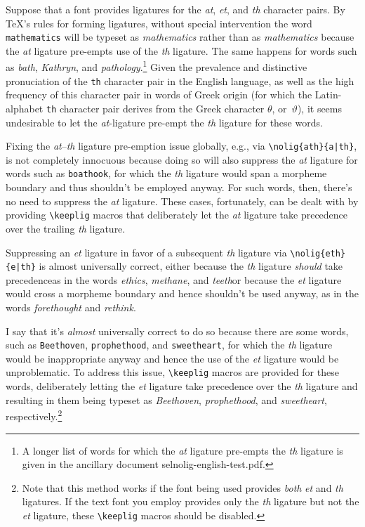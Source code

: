 \documentclass[12pt]{article}
\newcommand{\pkg}[1]{\textsf{#1}}
\newcommand{\opt}[1]{\texttt{#1}}
\newcommand{\cmmd}[1]{\texttt{\textbackslash #1}}
\begin{document}
Suppose that a font provides ligatures for the \emph{at}, \emph{et}, and \emph{th} character pairs. By \TeX's rules for forming ligatures, without special intervention the word \opt{mathematics} will be typeset as \emph{m\mbox{at}hematics} rather than as \emph{mathematics} because the \emph{at} ligature pre-empts use of the \emph{th} ligature. The same happens for words such as \emph{b\mbox{at}h}, \emph{K\mbox{at}hryn}, and \emph{p\mbox{at}hology}.\footnote{A longer list of words for which the \emph{at} ligature pre-empts the \emph{th} ligature is given in the ancillary document \pkg{selnolig-english-test.pdf}. }
Given the prevalence and distinctive pronuciation of the \opt{th} character pair in the English language, as well as the high frequency of this character pair in words of Greek origin (for which the Latin-alphabet \opt{th} character pair derives from the Greek character $\theta$, or~$\vartheta$), it seems undesirable to let the \emph{at}-ligature pre-empt the \emph{th} ligature for these words. 

Fixing the \emph{at}--\emph{th} ligature pre-emption issue globally, e.g., via \Verb+\nolig{ath}{a|th}+, is not completely innocuous because doing so will also suppress the \emph{at} ligature for words such as \opt{boathook}, for which the \emph{th} ligature would span a morpheme boundary and thus shouldn't be employed anyway. For such words, then, there's no need to suppress the \emph{at} ligature. These cases, fortunately, can be dealt with by providing \cmmd{keeplig} macros that deliberately let the \emph{at} ligature take precedence over the trailing \emph{th} ligature.

Suppressing an \emph{et} ligature in favor of a subsequent \emph{th} ligature via \Verb+\nolig{eth}{e|th}+ is almost universally correct, either because the \emph{th} ligature \emph{should} take precedence\textemdash as in the words \emph{ethics}, \emph{methane}, and \emph{teeth}\textemdash or because the \emph{et} ligature would cross a morpheme boundary and hence shouldn't be used anyway, as in the words \emph{forethought} and \emph{rethink}. 

I say that it's \emph{almost} universally correct to do so because there are some words, such as \opt{Beethoven}, \opt{prophethood}, and \opt{sweetheart}, for which the \emph{th} ligature would be inappropriate anyway and hence the use of the \emph{et} ligature would be unproblematic. 
To address this issue, \cmmd{keeplig} macros are provided for these words, deliberately letting the \emph{et} ligature take precedence over the \emph{th} ligature and resulting in them being typeset as \emph{Beethoven}, \emph{prophethood}, and \emph{sweetheart}, respectively.\footnote{Note that this method works if the font being used provides \emph{both} \emph{et} and \emph{th} ligatures. If the text font you employ provides only the \emph{th} ligature but not the \emph{et} ligature, these \cmmd{keeplig} macros should be disabled.}
\end{document}
